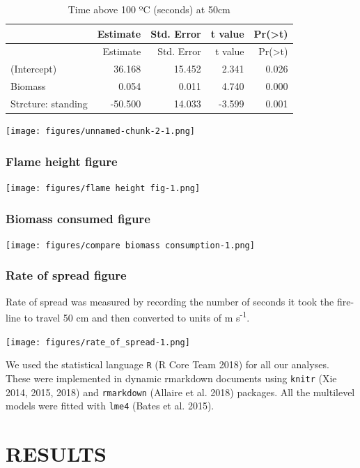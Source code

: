 \documentclass[11pt,a4paper]{article}
\begin{document}
\begin{longtable}[]{@{}lrrrr@{}}
\caption{Time above 100 ºC (seconds) at 50cm}\tabularnewline
\toprule
& Estimate & Std. Error & t value &
Pr(\textgreater{}\textbar{}t\textbar{})\tabularnewline
\midrule
\endfirsthead
\toprule
& Estimate & Std. Error & t value &
Pr(\textgreater{}\textbar{}t\textbar{})\tabularnewline
\midrule
\endhead
(Intercept) & 36.168 & 15.452 & 2.341 & 0.026\tabularnewline
Biomass & 0.054 & 0.011 & 4.740 & 0.000\tabularnewline
Strcture: standing & -50.500 & 14.033 & -3.599 & 0.001\tabularnewline
\bottomrule
\end{longtable}

\texttt{[image: figures/unnamed-chunk-2-1.png]}

\hypertarget{flame-height-figure}{%
\subsubsection{Flame height figure}\label{flame-height-figure}}

\texttt{[image: figures/flame height fig-1.png]}

\hypertarget{biomass-consumed-figure}{%
\subsubsection{Biomass consumed figure}\label{biomass-consumed-figure}}

\texttt{[image: figures/compare biomass consumption-1.png]}

\hypertarget{rate-of-spread-figure}{%
\subsubsection{Rate of spread figure}\label{rate-of-spread-figure}}

Rate of spread was measured by recording the number of seconds it took
the fire-line to travel 50 cm and then converted to units of m
s\textsuperscript{-1}.

\texttt{[image: figures/rate\_of\_spread-1.png]}

We used the statistical language \texttt{R} (R Core Team 2018) for all
our analyses. These were implemented in dynamic rmarkdown documents
using \texttt{knitr} (Xie 2014, 2015, 2018) and \texttt{rmarkdown}
(Allaire et al. 2018) packages. All the multilevel models were fitted
with \texttt{lme4} (Bates et al. 2015).

\hypertarget{results}{%
\section{RESULTS}\label{results}}
\end{document}
